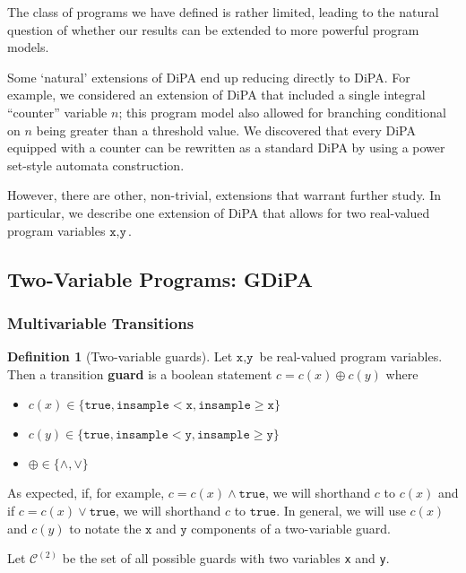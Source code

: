 \documentclass[12pt]{article}
\newcommand{\gguard}[1][x]{\texttt{insample}\geq #1}
\newcommand{\lguard}[1][x]{\texttt{insample} < #1}
\theoremstyle{definition}
\newtheorem{defn}[thm]{Definition}
\begin{document}
The class of programs we have defined is rather limited, leading to the natural question of whether our results can be extended to more powerful program models. 

Some `natural' extensions of DiPA end up reducing directly to DiPA. For example, we considered an extension of DiPA that included a single integral ``counter'' variable $n$; this program model also allowed for branching conditional on $n$ being greater than a threshold value. 
We discovered that every DiPA equipped with a counter can be rewritten as a standard DiPA by using a power set-style automata construction. 

However, there are other, non-trivial, extensions that warrant further study. In particular, we describe one extension of DiPA that allows for two real-valued program variables $\texttt{x}, \texttt{y}$.

\subsection{Two-Variable Programs: GDiPA}

\subsubsection{Multivariable Transitions}

\begin{defn}[Two-variable guards]
    Let $\texttt{x}, \texttt{y}$ be real-valued program variables. Then a transition \textbf{guard} is a boolean statement $c = c(x)\oplus c(y)$ where \begin{itemize}
        \item $c(x)\in \{\texttt{true}, \lguard[\texttt{x}], \gguard[\texttt{x}]\}$
        \item $c(y)\in \{\texttt{true}, \lguard[\texttt{y}], \gguard[\texttt{y}]\}$
        \item $\oplus \in \{\land, \lor\}$
    \end{itemize}
    As expected, if, for example, $c = c(x) \land \texttt{true}$, we will shorthand $c$ to $c(x)$ and if $c = c(x)\lor \texttt{true}$, we will shorthand $c$ to $\texttt{true}$. In general, we will use $c(x)$ and $c(y)$ to notate the $\texttt{x}$ and $\texttt{y}$ components of a two-variable guard. 

    Let $\mathcal{C}^{(2)}$ be the set of all possible guards with two variables \texttt{x} and \texttt{y}.
\end{defn}
\end{document}
